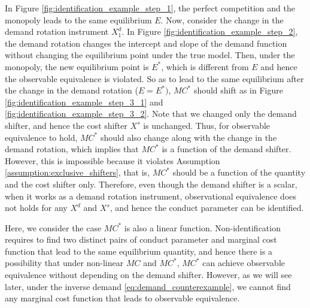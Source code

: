 \documentclass[11pt, a4paper]{article}
\theoremstyle{remark}
\begin{document}
In Figure \ref{fig:identification_example_step_1}, the perfect competition and the monopoly leads to the same equilibrium $E$.
Now, consider the change in the demand rotation instrument $X^{d}_1$.
In Figure \ref{fig:identification_example_step_2}, the demand rotation changes the intercept and slope of the demand function without changing the equilibrium point under the true model.
Then, under the monopoly, the new equilibrium point is $E^{*}$, which is different from $E$ and hence the observable equivalence is violated.
So as to lead to the same equilibrium after the change in the demand rotation ($E = E^{*})$, $MC^{*}$ should shift as in Figure \ref{fig:identification_example_step_3_1} and \ref{fig:identification_example_step_3_2}.
Note that we changed only the demand shifter, and hence the cost shifter $X^{s}$ is unchanged.
Thus, for observable equivalence to hold, $MC^{*}$ should also change along with the change in the demand rotation, which implies that $MC^{*}$ is a function of the demand shifter.
However, this is impossible because it violates Assumption \ref{assumption:exclusive_shifters}, that is, $MC^{*}$ should be a function of the quantity and the cost shifter only.
Therefore, even though the demand shifter is a scalar, when it works as a demand rotation instrument, observational equivalence does not holds for any $X^{d}$ and $X^{s}$, and hence the conduct parameter can be identified.


Here, we consider the case $MC^{*}$ is also a linear function.
Non-identification requires to find two distinct pairs of conduct parameter and marginal cost function that lead to the same equilibrium quantity, and hence there is a possibility that under non-linear $MC$ and $MC^{*}$, $MC^{*}$ can achieve observable equivalence without depending on the demand shifter.
However, as we will see later, under the inverse demand \eqref{eq:demand_counterexample}, we cannot find any marginal cost function that leads to observable equivalence.
\end{document}
